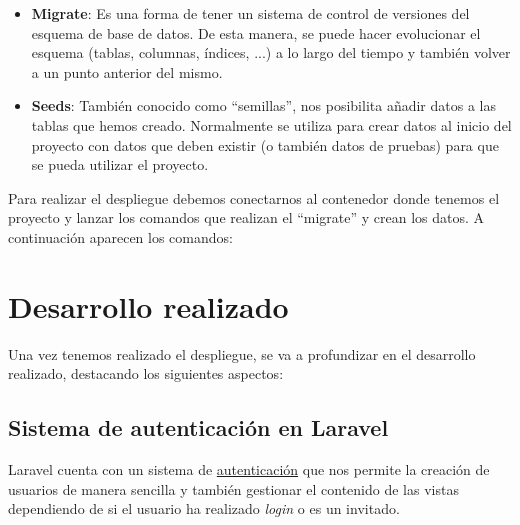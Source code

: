 \documentclass{\ClassPath/viu-tfm-template}
\begin{document}
\vspace{-1em}
\begin{itemize}
    \item \textbf{Migrate}: Es una forma de tener un sistema de control de versiones del esquema de base de datos. De esta manera, se puede hacer evolucionar el esquema (tablas, columnas, índices, ...) a lo largo del tiempo y también volver a un punto anterior del mismo.
    \item \textbf{Seeds}: También conocido como “semillas”, nos posibilita añadir datos a las tablas que hemos creado. Normalmente se utiliza para crear datos al inicio del proyecto con datos que deben existir (o también datos de pruebas) para que se pueda utilizar el proyecto.
\end{itemize}
\vspace{-1em}

Para realizar el despliegue debemos conectarnos al contenedor donde tenemos el proyecto y lanzar los comandos que realizan el “migrate” y crean los datos. A continuación aparecen los comandos:




\chapter{Desarrollo realizado}

Una vez tenemos realizado el despliegue, se va a profundizar en el desarrollo realizado, destacando los siguientes aspectos:

\section{Sistema de autenticación en Laravel}
Laravel cuenta con un sistema de \href{https://laravel.com/docs/6.x/authentication}{autenticación} que nos permite la creación de usuarios de manera sencilla y también gestionar el contenido de las vistas dependiendo de si el usuario ha realizado \textit{login} o es un invitado.
\end{document}
